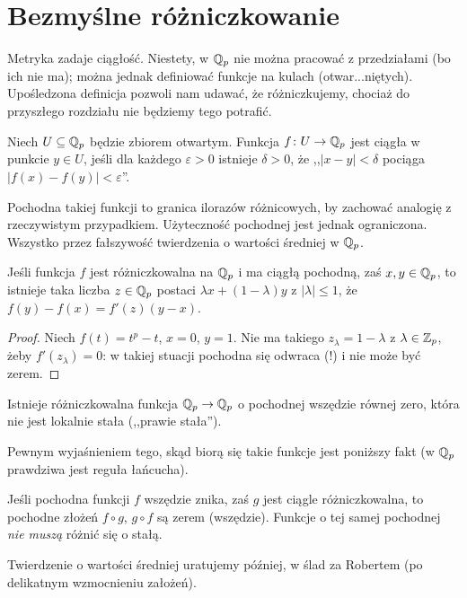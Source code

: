 \section{Bezmyślne różniczkowanie}	
Metryka zadaje ciągłość.
Niestety, w $\mathbb Q_p$ nie można pracować z przedziałami (bo ich nie ma); można jednak definiować funkcje na kulach (otwar...niętych). 
Upośledzona definicja pozwoli nam udawać, że różniczkujemy, chociaż do przyszłego rozdziału nie będziemy tego potrafić.

\begin{definicja}
	Niech $U \subseteq \mathbb Q_p$ będzie zbiorem otwartym.
	Funkcja $f \colon U \to \mathbb Q_p$ jest ciągła w punkcie $y \in U$, jeśli dla każdego $\varepsilon > 0$ istnieje $\delta > 0$, że ,,$|x-y| < \delta$ pociąga $|f(x) - f(y)| < \varepsilon$''.
\end{definicja}


Pochodna takiej funkcji to granica ilorazów różnicowych, by zachować analogię z rzeczywistym przypadkiem.
Użyteczność pochodnej jest jednak ograniczona.
Wszystko przez fałszywość twierdzenia o wartości średniej w $\mathbb Q_p$.

\begin{fakt} [fałszywy]
	Jeśli funkcja $f$ jest różniczkowalna na $\mathbb Q_p$ i ma ciągłą pochodną, zaś $x,y \in \mathbb Q_p$, to istnieje taka liczba $z \in \mathbb Q_p$ postaci $\lambda x + (1-\lambda)y$ z $|\lambda| \le 1$, że $f(y) - f(x) = f'(z) (y-x)$.
\end{fakt}

\begin{proof}
	Niech $f(t) = t^p - t$, $x = 0$, $y = 1$.
	Nie ma takiego $z_\lambda = 1 - \lambda$ z $\lambda \in \mathbb Z_p$, żeby $f'(z_\lambda) = 0$: w takiej stuacji pochodna się odwraca (!) i nie może być zerem.
\end{proof}

\begin{fakt}
	Istnieje różniczkowalna funkcja $\mathbb Q_p \to \mathbb Q_p$ o pochodnej wszędzie równej zero, która nie jest lokalnie stała (,,prawie stała'').
\end{fakt}

Pewnym wyjaśnieniem tego, skąd biorą się takie funkcje jest poniższy fakt (w $\mathbb Q_p$ prawdziwa jest reguła łańcucha). %

\begin{fakt}
	Jeśli pochodna funkcji $f$ wszędzie znika, zaś $g$ jest ciągle różniczkowalna, to pochodne złożeń $f \circ g$, $g \circ f$ są zerem (wszędzie).
	Funkcje o tej samej pochodnej \emph{nie muszą} różnić się o stałą.
\end{fakt}

Twierdzenie o wartości średniej uratujemy później, w ślad za Robertem (po delikatnym wzmocnieniu założeń).
